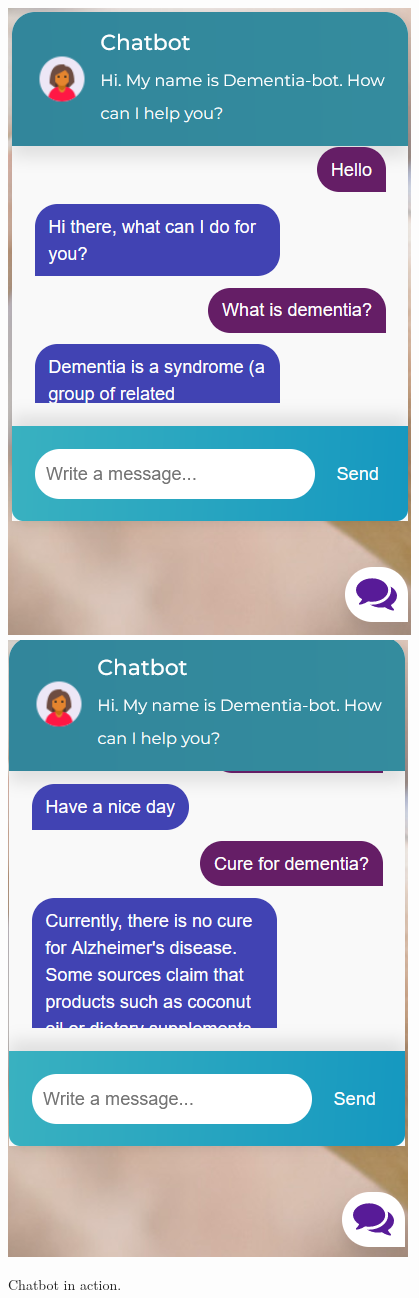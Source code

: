 \begin{figure}[ht!]
	\includegraphics[width=.4\textwidth]{chat1}\hfill
	\includegraphics[width=.4\textwidth]{chat2}\hfill
	\caption{Chatbot in action.}
\end{figure}

\def\baselinestretch{1.66}

 



